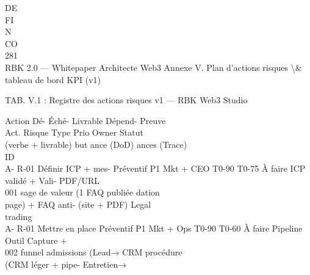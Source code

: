 \vspace{0.5em}
\vspace{0.5em}
\vspace{0.5em}
\vspace{0.5em}
DE\\
FI\\
N\\
CO\\
\vspace{0.5em}
\vspace{0.5em}
\vspace{0.5em}
\vspace{0.5em}
281\\
RBK 2.0 — Whitepaper Architecte Web3                                                                      Annexe V. Plan d’actions risques \textbackslash{}& tableau de bord KPI (v1)\\
\vspace{0.5em}
\vspace{0.5em}
\begin{center}\begin{tabular}TAB. V.1 : Registre des actions risques v1 — RBK Web3 Studio\end{tabular}\end{center}
Action                                         Dé-   Éché-           Livrable       Dépend- Preuve\\
Act. Risque                    Type      Prio Owner                    Statut\\
(verbe + livrable)                             but   ance            (DoD)          ances   (Trace)\\
ID\\
A- R-01     Définir ICP + mes- Préventif P1   Mkt + CEO    T0-90 T0-75 À faire   ICP validé +   Vali-      PDF/URL\\
001         sage de valeur (1                                                    FAQ publiée    dation\\
page) + FAQ anti-                                                    (site + PDF)   Legal\\
trading\\
A- R-01     Mettre en place    Préventif P1   Mkt + Ops    T0-90 T0-60 À faire   Pipeline      Outil   Capture +\\
002         funnel admissions                                                    (Lead→        CRM     procédure\\
(CRM léger + pipe-                                                   Entretien→\\
